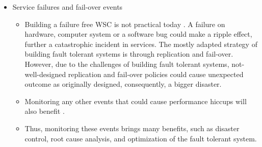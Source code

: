 \begin{itemize}
\begin{itemize}
      \item Service failures and fail-over events
        \begin{itemize}
          \item Building a failure free WSC is not practical today \autocite{DBLP:books/others/red, DBLP:conf/lisa/Hamilton07, DBLP:journals/cacm/DeanB13}. A failure on hardware, computer system or a software bug could make a ripple effect, further a catastrophic incident in services. The mostly adapted strategy of building fault tolerant systems is through replication and fail-over. However, due to the challenges of building fault tolerant systems, not-well-designed replication and fail-over policies could cause unexpected outcome as originally designed, consequently, a bigger disaster.
          \item Monitoring any other events that could cause performance hiccups will also benefit \autocite{DBLP:conf/lisa/Hamilton07, DBLP:journals/cacm/DeanB13}.
          \item Thus, monitoring these events brings many benefits, such as disaster control, root cause analysis, and optimization of the fault tolerant system.
        \end{itemize}


\end{itemize}
\end{itemize}
